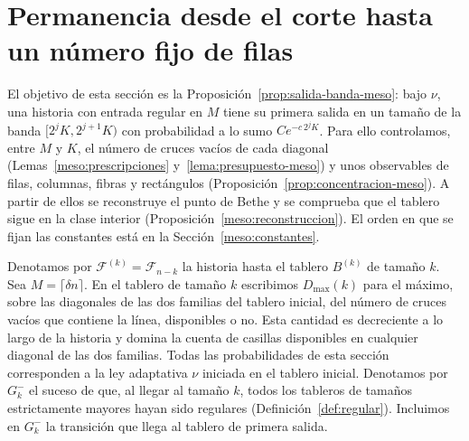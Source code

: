 \section{Permanencia desde el corte hasta un número fijo de filas}\label{meso}
El objetivo de esta sección es la Proposición~\ref{prop:salida-banda-meso}: bajo $\nu$, una
historia con entrada regular en $M$ tiene su primera salida en un tamaño de la banda
$[2^jK,2^{j+1}K)$ con probabilidad a lo sumo $Ce^{-c\,2^jK}$. Para ello controlamos, entre $M$ y
$K$, el número de cruces vacíos de cada diagonal (Lemas~\ref{meso:prescripciones}
y~\ref{lema:presupuesto-meso}) y unos observables de filas, columnas, fibras y rectángulos
(Proposición~\ref{prop:concentracion-meso}). A partir de ellos se reconstruye el punto de Bethe y se
comprueba que el tablero sigue en la clase interior (Proposición~\ref{meso:reconstruccion}). El
orden en que se fijan las constantes está en la Sección~\ref{meso:constantes}.

Denotamos por $\mathcal F^{(k)}=\mathcal F_{n-k}$ la historia hasta el tablero $B^{(k)}$ de tamaño $k$.
Sea $M=\lceil\delta n\rceil$. En el tablero de tamaño $k$ escribimos $D_{\max}(k)$ para el máximo, sobre
las diagonales de las dos familias del tablero inicial, del número de cruces vacíos que
contiene la línea, disponibles o no. Esta cantidad es
decreciente a lo largo de la historia y domina la cuenta de casillas disponibles en cualquier
diagonal de las dos familias. Todas las probabilidades de esta sección corresponden a la ley
adaptativa $\nu$ iniciada en el tablero inicial. Denotamos por $G_k^-$ el suceso de que, al llegar al
tamaño $k$, todos los tableros de tamaños estrictamente mayores hayan sido regulares
(Definición~\ref{def:regular}). Incluimos en $G_k^-$ la transición que llega al tablero de primera
salida.

